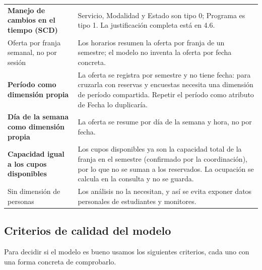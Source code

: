 \documentclass[11pt,letterpaper]{article}
\begin{document}
\begin{longtable}{>{\raggedright\arraybackslash}p{}>{\raggedright\arraybackslash}p{}}
\textbf{Manejo de cambios en el tiempo (SCD)} & Servicio, Modalidad y Estado son tipo 0; Programa es tipo 1. La justificación completa está en 4.6. \\
Oferta por franja semanal, no por sesión & Los horarios resumen la oferta por franja de un semestre; el modelo no inventa la oferta por fecha concreta. \\
\textbf{Período como dimensión propia} & La oferta se registra por semestre y no tiene fecha: para cruzarla con reservas y encuestas necesita una dimensión de período compartida. Repetir el período como atributo de Fecha lo duplicaría. \\
\textbf{Día de la semana como dimensión propia} & La oferta se resume por día de la semana y hora, no por fecha. \\
\textbf{Capacidad igual a los cupos disponibles} & Los cupos disponibles ya son la capacidad total de la franja en el semestre (confirmado por la coordinación), por lo que no se suman a los reservados. La ocupación se calcula en la consulta y no se guarda. \\
Sin dimensión de personas & Los análisis no la necesitan, y así se evita exponer datos personales de estudiantes y monitores. \\
\bottomrule
\end{longtable}
\endgroup


\subsection{Criterios de calidad del modelo}

Para decidir si el modelo es bueno usamos los siguientes criterios, cada uno con una forma concreta de comprobarlo.
\end{document}
